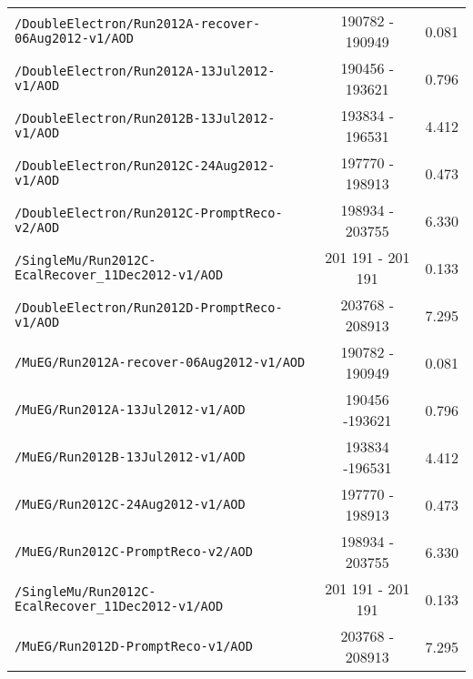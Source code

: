 \begin{table}[hbt]
\begin{center}
\begin{tabular}{lcc}
\verb=/DoubleElectron/Run2012A-recover-06Aug2012-v1/AOD=         &    190782 - 190949     & 0.081              \\ 
\verb=/DoubleElectron/Run2012A-13Jul2012-v1/AOD=                         & 190456 - 193621   & 0.796                    \\ 
\verb=/DoubleElectron/Run2012B-13Jul2012-v1/AOD=                         &  193834 - 196531  & 4.412\\ 
\verb=/DoubleElectron/Run2012C-24Aug2012-v1/AOD=                       &  197770 - 198913    & 0.473                 \\ 
\verb=/DoubleElectron/Run2012C-PromptReco-v2/AOD=                     &   198934 - 203755     & 6.330             \\ 
\verb=/SingleMu/Run2012C-EcalRecover_11Dec2012-v1/AOD=          & 201 191 - 201 191 & 0.133\\
\verb=/DoubleElectron/Run2012D-PromptReco-v1/AOD=                      &  203768 - 208913  &  7.295 \\

\verb=/MuEG/Run2012A-recover-06Aug2012-v1/AOD=                          &      190782 - 190949     & 0.081            \\ 
\verb=/MuEG/Run2012A-13Jul2012-v1/AOD=                                          &  190456 -193621         & 0.796             \\ 
\verb=/MuEG/Run2012B-13Jul2012-v1/AOD=                                         &  193834 -196531      & 4.412 \\ 
\verb=/MuEG/Run2012C-24Aug2012-v1/AOD=                                      &   197770 - 198913     & 0.473               \\ 
\verb=/MuEG/Run2012C-PromptReco-v2/AOD=                                     &   198934 - 203755      & 6.330              \\ 
\verb=/SingleMu/Run2012C-EcalRecover_11Dec2012-v1/AOD=          & 201 191 - 201 191 & 0.133\\
\verb=/MuEG/Run2012D-PromptReco-v1/AOD=                                     &  203768 - 208913  &  7.295 \\


\end{tabular}
\end{center}
\end{table}

